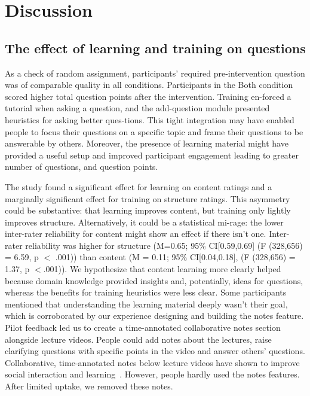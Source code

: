 \section{Discussion}
\subsection{The effect of learning and training on questions}
As a check of random assignment, participants’ required pre-intervention question was of comparable quality in all conditions. Participants in the Both condition scored higher total question points after the intervention. Training en-forced a tutorial when asking a question, and the add-question module presented heuristics for asking better ques-tions. This tight integration may have enabled people to focus their questions on a specific topic and frame their questions to be answerable by others. Moreover, the presence of learning material might have provided a useful setup and improved participant engagement leading to greater number of questions, and question points.

The study found a significant effect for learning on content ratings and a marginally significant effect for training on structure ratings. This asymmetry could be substantive: that learning improves content, but training only lightly improves structure. Alternatively, it could be a statistical mi-rage: the lower inter-rater reliability for content might show an effect if there isn’t one. Inter-rater reliability was higher for structure (M=0.65; 95\% CI[0.59,0.69] (F (328,656) = 6.59, p $<$ .001)) than content (M = 0.11; 95\% CI[0.04,0.18], (F (328,656) = 1.37, p $<$.001)).
We hypothesize that content learning more clearly helped because domain knowledge provided insights and, potentially, ideas for questions, whereas the benefits for training heuristics were less clear. Some participants mentioned that understanding the learning material deeply wasn’t their goal, which is corroborated by our experience designing and building the notes feature. Pilot feedback led us to create a time-annotated collaborative notes section alongside lecture videos. People could add notes about the lectures, raise clarifying questions with specific points in the video and answer others’ questions. Collaborative, time-annotated notes below lecture videos have shown to improve social interaction and learning~\cite{Lee2015}. However, people hardly used the notes features. After limited uptake, we removed these notes.

